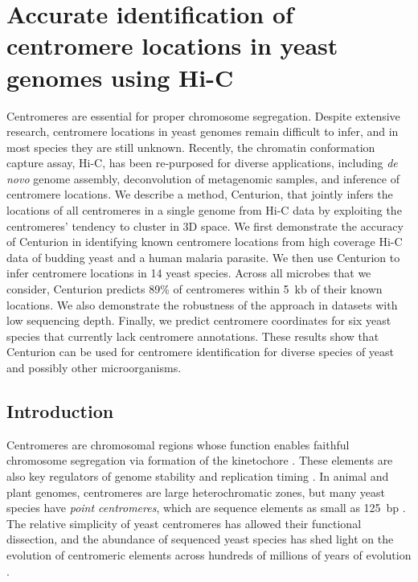 
\chapter{
Accurate identification of centromere locations in yeast genomes using Hi-C}
\graphicspath{{4_centurion/figures/}}


Centromeres are essential for proper chromosome segregation. Despite extensive
research, centromere locations in yeast genomes remain difficult to infer, and
in most species they are still unknown. Recently, the chromatin conformation
capture assay, Hi-C, has been re-purposed for diverse applications, including
\textit{de novo} genome assembly, deconvolution of metagenomic samples, and inference
of centromere locations. We describe a method, Centurion, that jointly infers
the locations of all centromeres in a single genome from Hi-C data by
exploiting the centromeres' tendency to cluster in 3D space. We first
demonstrate the accuracy of Centurion in identifying known centromere
locations from high coverage Hi-C data of budding yeast and a human malaria
parasite. We then use Centurion to infer centromere locations in 14 yeast
species. Across all microbes that we consider, Centurion predicts 89\% of
centromeres within 5~kb of their known locations. We also demonstrate the
robustness of the approach in datasets with low sequencing depth. Finally, we
predict centromere coordinates for six yeast species that currently lack
centromere annotations. These results show that Centurion can be used for
centromere identification for diverse species of yeast and possibly other
microorganisms.

\section{Introduction}

Centromeres are chromosomal regions whose function enables faithful chromosome
segregation via formation of the kinetochore \cite{Bloom:centromeric}. These
elements are also key regulators of genome stability \cite{Feng:centromere}
and replication timing \citep{koren:epigenetically, pohl:functional}. In
animal and plant genomes, centromeres are large heterochromatic zones, but
many yeast species have {\em point centromeres}, which are sequence
elements as small as 125~bp \citep{cottarel:125-base-pair}. The relative
simplicity of yeast centromeres has allowed their functional dissection, and
the abundance of sequenced yeast species has shed light on the evolution of
centromeric elements across hundreds of millions of years of evolution
\citep{Gordon:mechanisms}.

